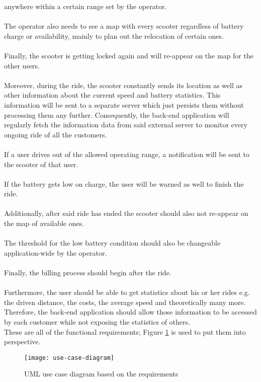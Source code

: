 \documentclass[12pt,a4paper,twoside]{report}
\begin{document}
anywhere within a certain range set by the operator.\\\\
The operator also needs to see a map with every scooter regardless of battery
charge or availability, mainly to plan out the relocation of certain ones.\\\\
Finally, the scooter is getting locked again and will re-appear on the map for the other users.\\\\
Moreover, during the ride, the scooter constantly sends its location as well
as other information about the current speed and battery statistics.
This information will be sent to a separate server which just persists them
without processing them any further.
Consequently, the back-end application will regularly fetch the information data
from said external server to monitor every ongoing ride of all the customers.\\\\
If a user drives out of the allowed operating range, a notification will be sent
to the scooter of that user.\\\\
If the battery gets low on charge, the user will be warned as well to finish the ride.\\\\
Additionally, after said ride has ended the scooter should also not re-appear
on the map of available ones.\\\\
The threshold for the low battery condition should also be changeable
application-wide by the operator.\\\\
Finally, the billing process should begin after the ride.\\\\
Furthermore, the user should be able to get statistics about his or her rides
e.g. the driven distance, the costs, the average speed and theoretically
many more. Therefore, the back-end application should allow those information
to be accessed by each customer while not exposing the statistics of others.\\

These are all of the functional requirements;
Figure \ref{fig:use-case-diagram} is used to put them into perspective.\\

\begin{figure}[htbp]
\centering
\texttt{[image: use-case-diagram]}
\caption{UML use case diagram based on the requirements}
\label{fig:use-case-diagram}
\end{figure}
\end{document}
